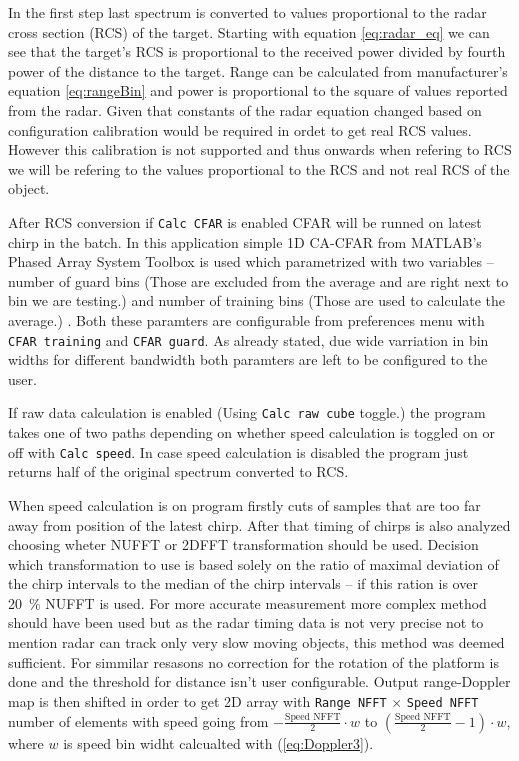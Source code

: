 In the first step last spectrum is converted to values proportional to the radar cross section (RCS) of the target.
Starting with equation \ref{eq:radar_eq} we can see that the target's RCS is proportional to the received power divided by fourth power of the distance to the target.
Range can be calculated from manufacturer's equation \ref{eq:rangeBin} and power is proportional to the square of values reported from the radar.
Given that constants of the radar equation changed based on configuration calibration would be required in ordet to get real RCS values.
However this calibration is not supported and thus onwards when refering to RCS we will be refering to the values proportional to the RCS and not real RCS of the object.

After RCS conversion if \texttt{Calc CFAR} is enabled CFAR will be runned on latest chirp in the batch.
In this application simple 1D CA-CFAR from MATLAB's Phased Array System Toolbox is used which parametrized with two variables -- number of guard bins (Those are excluded from the average and are right next to bin we are testing.) and number of training bins (Those are used to calculate the average.) \cite{matlab_cfar}.
Both these paramters are configurable from preferences menu with \texttt{CFAR training} and \texttt{CFAR guard}.
As already stated, due wide varriation in bin widths for different bandwidth both paramters are left to be configured to the user.

If raw data calculation is enabled (Using \texttt{Calc raw cube} toggle.) the program takes one of two paths depending on whether speed calculation is toggled on or off with \texttt{Calc speed}.
In case speed calculation is disabled the program just returns half of the original spectrum converted to RCS.

When speed calculation is on program firstly cuts of samples that are too far away from position of the latest chirp.
After that timing of chirps is also analyzed choosing wheter NUFFT or 2DFFT transformation should be used.
Decision which transformation to use is based solely on the ratio of maximal deviation of the chirp intervals to the median of the chirp intervals -- if this ration is over 20~\% NUFFT is used.
For more accurate measurement more complex method should have been used but as the radar timing data is not very precise not to mention radar can track only very slow moving objects, this method was deemed sufficient.
For simmilar resasons no correction for the rotation of the platform is done and the threshold for distance isn't user configurable.
Output range-Doppler map is then shifted in order to get 2D array with \texttt{Range NFFT} $\times$ \texttt{Speed NFFT} number of elements with speed going from $-\frac{\text{Speed NFFT}}{2}\cdot w $ to  $\left(\frac{\text{Speed NFFT}}{2}-1\right)\cdot w $, where $w$ is speed bin widht calcualted with (\ref{eq:Doppler3}).


